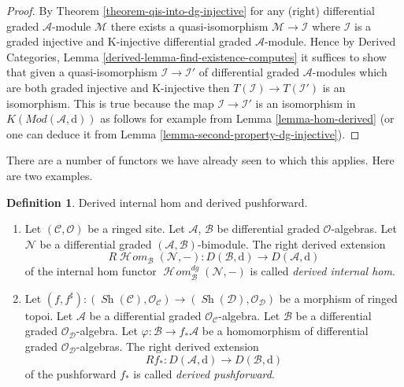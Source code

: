 \documentclass{stacks-project}
\theoremstyle{plain}
\theoremstyle{definition}
\newtheorem{definition}[subsection]{Definition}
\theoremstyle{remark}
\numberwithin{equation}{subsection}
\def\SheafHom{\mathop{\mathcal{H}\!\mathit{om}}\nolimits}
\def\Sh{\mathop{\mathit{Sh}}\nolimits}
\begin{document}
\begin{proof}
By Theorem \ref{theorem-qis-into-dg-injective}
for any (right) differential graded $\mathcal{A}$-module
$\mathcal{M}$ there exists a quasi-isomorphism
$\mathcal{M} \to \mathcal{I}$ where $\mathcal{I}$
is a graded injective and K-injective
differential graded $\mathcal{A}$-module.
Hence by Derived Categories, Lemma \ref{derived-lemma-find-existence-computes}
it suffices to show that given a quasi-isomorphism
$\mathcal{I} \to \mathcal{I}'$ of differential graded
$\mathcal{A}$-modules which are both
graded injective and K-injective
then $T(\mathcal{I}) \to T(\mathcal{I}')$ is an isomorphism.
This is true because the map $\mathcal{I} \to \mathcal{I}'$
is an isomorphism in $K(\textit{Mod}(\mathcal{A}, \text{d}))$ as follows
for example from Lemma \ref{lemma-hom-derived} (or one can
deduce it from Lemma \ref{lemma-second-property-dg-injective}).
\end{proof}

\noindent
There are a number of functors we have already seen to which this applies.
Here are two examples.

\begin{definition}
\label{definition-pushforward}
Derived internal hom and derived pushforward.
\begin{enumerate}
\item Let $(\mathcal{C}, \mathcal{O})$ be a ringed site. Let
$\mathcal{A}$, $\mathcal{B}$ be differential graded $\mathcal{O}$-algebras.
Let $\mathcal{N}$ be a  differential graded
$(\mathcal{A}, \mathcal{B})$-bimodule. The right derived extension
$$
R\SheafHom_\mathcal{B}(\mathcal{N}, -) :
D(\mathcal{B}, \text{d})
\longrightarrow
D(\mathcal{A}, \text{d})
$$
of the internal hom functor $\SheafHom_\mathcal{B}^{dg}(\mathcal{N}, -)$
is called {\it derived internal hom}.
\item Let $(f, f^\sharp) : (\Sh(\mathcal{C}), \mathcal{O}_\mathcal{C})
\to (\Sh(\mathcal{D}), \mathcal{O}_\mathcal{D})$
be a morphism of ringed topoi. Let $\mathcal{A}$ be a differential
graded $\mathcal{O}_\mathcal{C}$-algebra. Let $\mathcal{B}$ be a
differential graded $\mathcal{O}_\mathcal{D}$-algebra. Let
$\varphi : \mathcal{B} \to f_*\mathcal{A}$ be a homomorphism
of differential graded $\mathcal{O}_\mathcal{D}$-algebras.
The right derived extension
$$
Rf_* :
D(\mathcal{A}, \text{d})
\longrightarrow
D(\mathcal{B}, \text{d})
$$
of the pushforward $f_*$ is called {\it derived pushforward}.
\end{enumerate}
\end{definition}
\end{document}
